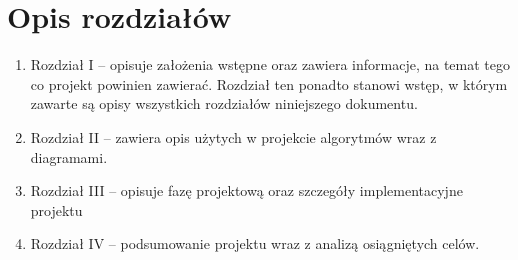 \section{Opis rozdziałów} %
\begin{enumerate}
	\item Rozdział I – opisuje założenia wstępne oraz zawiera informacje, na temat tego co projekt powinien zawierać. Rozdział ten ponadto stanowi wstęp, w którym zawarte są opisy wszystkich rozdziałów niniejszego dokumentu.
	\item Rozdział II – zawiera opis użytych w projekcie algorytmów wraz z diagramami.
	\item Rozdział III – opisuje fazę  projektową oraz szczegóły implementacyjne projektu
	\item Rozdział IV – podsumowanie projektu wraz z analizą osiągniętych celów.
\end{enumerate}




